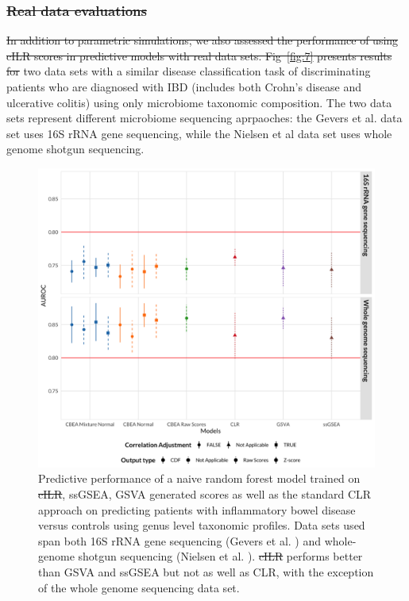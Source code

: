 \documentclass[10pt,letterpaper]{article}
\providecommand{\DIFaddtex}[1]{{\protect\color{blue}\uwave{#1}}} %
\providecommand{\DIFdeltex}[1]{{\protect\color{red}\sout{#1}}}                      %
\providecommand{\DIFaddbegin}{} %
\providecommand{\DIFaddend}{} %
\providecommand{\DIFdelbegin}{} %
\providecommand{\DIFdelend}{} %
\providecommand{\DIFaddFL}[1]{\DIFadd{#1}} %
\providecommand{\DIFdelFL}[1]{\DIFdel{#1}} %
\providecommand{\DIFaddbeginFL}{} %
\providecommand{\DIFaddendFL}{} %
\providecommand{\DIFdelbeginFL}{} %
\providecommand{\DIFdelendFL}{} %
\providecommand{\DIFadd}[1]{\texorpdfstring{\DIFaddtex{#1}}{#1}} %
\providecommand{\DIFdel}[1]{\texorpdfstring{\DIFdeltex{#1}}{}} %
\newcommand{\DIFscaledelfig}{0.5}
\newlength{\DIFdelgraphicswidth} %
\newlength{\DIFdelgraphicsheight} %
\newcommand{\DIFaddincludegraphics}[2][]{{\color{blue}\fbox{\DIFOincludegraphics[#1]{#2}}}} %
\newcommand{\DIFdelincludegraphics}[2][]{%
\sbox{\DIFdelgraphicsbox}{\DIFOincludegraphics[#1]{#2}}%
\settoboxwidth{\DIFdelgraphicswidth}{\DIFdelgraphicsbox} %
\settoboxtotalheight{\DIFdelgraphicsheight}{\DIFdelgraphicsbox} %
\scalebox{\DIFscaledelfig}{%
\parbox[b]{\DIFdelgraphicswidth}{\usebox{\DIFdelgraphicsbox}\\[-\baselineskip] \rule{\DIFdelgraphicswidth}{0em}}\llap{\resizebox{\DIFdelgraphicswidth}{\DIFdelgraphicsheight}{%
\setlength{\unitlength}{\DIFdelgraphicswidth}%
\begin{picture}(1,1)%
\thicklines\linethickness{2pt} %
{\color[rgb]{1,0,0}\put(0,0){\framebox(1,1){}}}%
{\color[rgb]{1,0,0}\put(0,0){\line( 1,1){1}}}%
{\color[rgb]{1,0,0}\put(0,1){\line(1,-1){1}}}%
\end{picture}%
}\hspace*{3pt}}} %
} %
\DeclareRobustCommand{\DIFaddbegin}{\DIFOaddbegin \let\includegraphics\DIFaddincludegraphics} %
\DeclareRobustCommand{\DIFaddend}{\DIFOaddend \let\includegraphics\DIFOincludegraphics} %
\DeclareRobustCommand{\DIFdelbegin}{\DIFOdelbegin \let\includegraphics\DIFdelincludegraphics} %
\DeclareRobustCommand{\DIFdelend}{\DIFOaddend \let\includegraphics\DIFOincludegraphics} %
\DeclareRobustCommand{\DIFaddbeginFL}{\DIFOaddbeginFL \let\includegraphics\DIFaddincludegraphics} %
\DeclareRobustCommand{\DIFaddendFL}{\DIFOaddendFL \let\includegraphics\DIFOincludegraphics} %
\DeclareRobustCommand{\DIFdelbeginFL}{\DIFOdelbeginFL \let\includegraphics\DIFdelincludegraphics} %
\DeclareRobustCommand{\DIFdelendFL}{\DIFOaddendFL \let\includegraphics\DIFOincludegraphics} %
\begin{document}
\DIFdelbegin \subsubsection*{\DIFdel{Real data evaluations}}
\DIFdel{In addition to parametric simulations, we also assessed the performance of using cILR scores in predictive models with real data sets. Fig~\ref{fig:7} presents results for }\DIFdelend \DIFaddbegin \DIFadd{We fit our model to }\DIFaddend two data sets with a similar disease classification task of discriminating patients who are diagnosed with IBD (includes both Crohn's disease and ulcerative colitis) using only microbiome taxonomic composition. The two data sets represent different microbiome sequencing aprpaoches: the Gevers et al. \cite{gevers2014} data set uses 16S rRNA gene sequencing, while the Nielsen et al \cite{nielsen2014} data set uses whole genome shotgun sequencing. 

\begin{figure}[!h]
    \centering
    \DIFdelbeginFL %
\DIFdelendFL \DIFaddbeginFL \includegraphics[width = \linewidth]{figures/data_pred.png}
    \DIFaddendFL \caption{Predictive performance of a naive random forest model trained on \DIFdelbeginFL \DIFdelFL{cILR}\DIFdelendFL \DIFaddbeginFL \DIFaddFL{CBEA}\DIFaddendFL , ssGSEA, GSVA generated scores as well as the standard CLR approach on predicting patients with inflammatory bowel disease versus controls using genus level taxonomic profiles. Data sets used span both 16S rRNA gene sequencing (Gevers et al. \cite{gevers2014}) and whole-genome shotgun sequencing (Nielsen et al. \cite{nielsen2014}). \DIFdelbeginFL \DIFdelFL{cILR }\DIFdelendFL \DIFaddbeginFL \DIFaddFL{CBEA }\DIFaddendFL performs better than GSVA and ssGSEA but not as well as CLR, with the exception of the whole genome sequencing data set.}
    \DIFdelbeginFL %
\DIFdelendFL \DIFaddbeginFL \label{fig:6}
\DIFaddendFL \end{figure}
\end{document}
